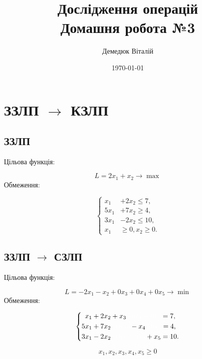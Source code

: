 \documentclass[a4paper, 12pt]{article}
\author{Демедюк Віталій}
\title{Дослідження операцій\\
	   Домашня робота №3}
\date{\today}
\begin{document}
\maketitle
\newpage

\tableofcontents


\newpage

\section{ЗЗЛП $\rightarrow$ КЗЛП}

\subsection{ЗЗЛП}

Цільова функція:

\begin{equation*}
L = 2x_1 + x_2 \rightarrow \max
\end{equation*}
Обмеження:

\begin{equation*}
\left\{
\begin{aligned}
	x_1 &+ 2x_2 \leq 7,\\
	5x_1 &+ 7x_2 \geq 4,\\
	3x_1 &- 2x_2 \leq 10,\\
	x_1 &\geq 0, x_2 \geq 0. 
\end{aligned}
\right.
\end{equation*}

\subsection{ЗЗЛП $\rightarrow$ СЗЛП}

Цільова функція:

\begin{equation*}
L = -2x_1 - x_2 + 0x_3 + 0x_4 + 0x_5 \rightarrow \min
\end{equation*}
Обмеження:

\[
\left\{
\begin{aligned}
	x_1 &+ 2x_2 + x_3 \textcolor{white}{+ 0x_4 + 0x_5} = 7,\\
	5x_1 &+ 7x_2 \textcolor{white}{+ 0x_33} - x_4 \textcolor{white}{+ 0x_5} = 4,\\
	3x_1 &- 2x_2 \textcolor{white}{+ 0x_3 + 0x_4} + x_5 = 10.\\ 
\end{aligned}
\right.
\]

\[ x_1, x_2, x_3, x_4, x_5 \geq 0 \]
\end{document}
